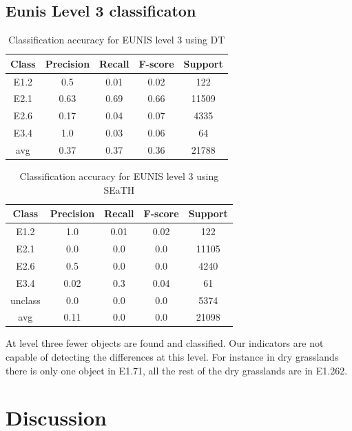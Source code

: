 \documentclass[authoryear,preprint,12pt,number]{elsarticle}
\begin{document}
\subsection{Eunis Level 3 classificaton}
\begin{table}
\centering
\begin{tabular}{c c c c c}
Class & Precision & Recall & F-score & Support\\
\hline
E1.2 & 0.5 & 0.01 & 0.02 & 122\\
E2.1 & 0.63 & 0.69 & 0.66 & 11509\\
E2.6 & 0.17 & 0.04 & 0.07 & 4335\\
E3.4 & 1.0 & 0.03 & 0.06 & 64\\
avg & 0.37 & 0.37 & 0.36 & 21788\\
\end{tabular}
\caption{Classification accuracy for EUNIS level 3 using DT}
\end{table}
\begin{table}
\centering
\begin{tabular}{c c c c c}
Class & Precision & Recall & F-score & Support\\
\hline
E1.2 & 1.0 & 0.01 & 0.02 & 122\\
E2.1 & 0.0 & 0.0 & 0.0 & 11105\\
E2.6 & 0.5 & 0.0 & 0.0 & 4240\\
E3.4 & 0.02 & 0.3 & 0.04 & 61\\
unclass & 0.0 & 0.0 & 0.0 & 5374\\
avg & 0.11 & 0.0 & 0.0 & 21098\\
\end{tabular}
\caption{Classification accuracy for EUNIS level 3 using SEaTH}
\end{table}
At level three fewer objects are found and classified. Our indicators are not 
capable of detecting the differences at this level. For instance in dry 
grasslands there is only one object in E1.71, all the rest of the dry 
grasslands are in E1.262.

\section{Discussion}
\end{document}
